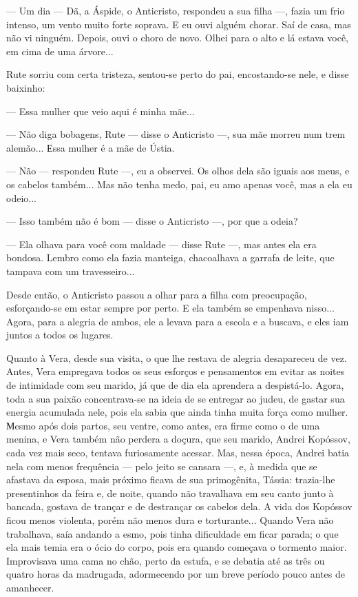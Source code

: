 --- Um dia --- Dã, a Áspide, o Anticristo, respondeu a sua filha ---,
fazia um frio intenso, um vento muito forte soprava. E eu ouvi alguém
chorar. Saí de casa, mas não vi ninguém. Depois, ouvi o choro de novo.
Olhei para o alto e lá estava você, em cima de uma árvore...

Rute sorriu com certa tristeza, sentou-se perto do pai, encostando-se
nele, e disse baixinho:

--- Essa mulher que veio aqui é minha mãe...

--- Não diga bobagens, Rute --- disse o Anticristo ---, sua mãe morreu
num trem alemão... Еssa mulher é a mãe de Ústia.

--- Não --- respondeu Rute ---, eu a observei. Os olhos dela são iguais
aos meus, e os cabelos também... Mas não tenha medo, pai, eu amo apenas
você, mas a ela eu odeio...

--- Isso também não é bom --- disse o Anticristo ---, por que a odeia?

--- Ela olhava para você com maldade --- disse Rute ---, mas antes ela
era bondosa. Lembro como ela fazia manteiga, chacoalhava a garrafa de
leite, que tampava com um travesseiro...

Desde então, o Anticristo passou a olhar para a filha com preocupação,
esforçando-se em estar sempre por perto. E ela também se empenhava
nisso... Agora, para a alegria de ambos, ele a levava para a escola e a
buscava, e eles iam juntos a todos os lugares.

Quanto à Vera, desde sua visita, o que lhe restava de alegria
desapareceu de vez. Antes, Vera empregava todos os seus esforços e
pensamentos em evitar as noites de intimidade com seu marido, já que de
dia ela aprendera a despistá-lo. Agora, toda a sua paixão concentrava-se
na ideia de se entregar ao judeu, de gastar sua energia acumulada nele,
pois ela sabia que ainda tinha muita força como mulher. Мesmo após dois
partos, seu ventre, como antes, era firme como o de uma menina, e Vera
também não perdera a doçura, que seu marido, Andrei Kopóssov, cada vez
mais seco, tentava furiosamente acessar. Mas, nessa época, Andrei batia
nela com menos frequência --- pelo jeito se cansara ---, e, à medida que
se afastava da esposa, mais próximo ficava de sua primogênita, Tássia:
trazia-lhe presentinhos da feira e, de noite, quando não travalhava em
seu canto junto à bancada, gostava de trançar e de destrançar os cabelos
dela. A vida dos Kopóssov ficou menos violenta, porém não menos dura e
torturante... Quando Vera não trabalhava, saía andando a esmo, pois
tinha dificuldade em ficar parada; o que ela mais temia era o ócio do
corpo, pois era quando começava o tormento maior. Improvisava uma cama
no chão, perto da estufa, e se debatia até as três ou quatro horas da
madrugada, adormecendo por um breve período pouco antes de amanhecer.

